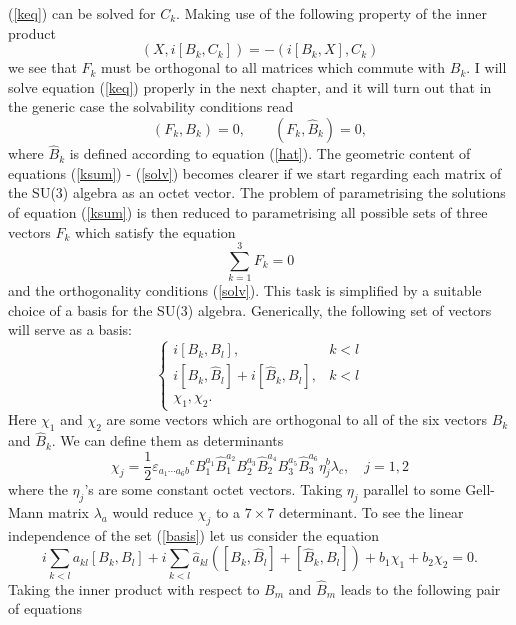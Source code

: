 \documentclass[a4paper,12pt]{article}
\begin{document}
(\ref{keq}) can be solved for $C_k$. Making use of the following property of
the inner product
$$ (X,i[B_k,C_k]) = -(i[B_k,X],C_k) $$
we see that $F_k$ must be orthogonal to all matrices which commute with $B_k$. I
will solve equation (\ref{keq}) properly in the next chapter, and it will
turn out that in the generic case the solvability conditions read
\begin{equation}\label{solv}
(F_k,B_k)=0, \qquad (F_k,\widehat{B}_k)=0,
\end{equation}
where $\widehat{B}_k$ is defined according to equation (\ref{hat}). The geometric content 
of equations (\ref{ksum}) - (\ref{solv}) becomes clearer if we start regarding each matrix 
of the SU(3) algebra as an octet vector. The problem of parametrising the solutions 
of equation (\ref{ksum}) is then reduced to parametrising all possible sets of 
three vectors $F_k$ which satisfy the equation
\begin{equation}\label{fsum}
\sum_{k=1}^3 F_k = 0
\end{equation}
and the orthogonality conditions (\ref{solv}). This task is simplified by a suitable 
choice of a basis for the SU(3) algebra. Generically, the following set of vectors 
will serve as a basis:
\begin{equation}\label{basis}
\left\{ \begin{array}{ll}
 i[B_k,B_l], & k < l \\
 i[B_k,\widehat{B}_l] + i[\widehat{B}_k,B_l], & k < l \\
 \chi_1, \chi_2. & \end{array} \right.
\end{equation}
Here $\chi_1$ and $\chi_2$ are some vectors which are orthogonal to all of the six vectors $B_k$ and $\widehat{B}_k$. We can define them as determinants
$$ \chi_j = \frac{1}{2} {\varepsilon_{a_1 \cdots a_6 b}}^c B_1^{a_1} \widehat{B}_1^{a_2} B_2^{a_3} \widehat{B}_2^{a_4} B_3^{a_5} \widehat{B}_3^{a_6} \eta_j^b \lambda_c, \quad j=1,2 $$
where the $\eta_j$'s are some constant octet vectors. Taking $\eta_j$ parallel to some Gell-Mann matrix $\lambda_a$ would reduce $\chi_j$ to a $7 \times 7$ determinant. To see the linear independence of the set (\ref{basis}) let us consider the equation
\begin{equation}\label{indep}
i\sum_{k<l} a_{kl} [B_k,B_l] + i\sum_{k<l} \widehat{a}_{kl} ( [B_k,\widehat{B}_l] + [\widehat{B}_k,B_l] ) + b_1 \chi_1 + b_2 \chi_2 = 0. 
\end{equation}
Taking the inner product with respect to $B_m$ and $\widehat{B}_m$ leads to the following pair of equations
\end{document}
